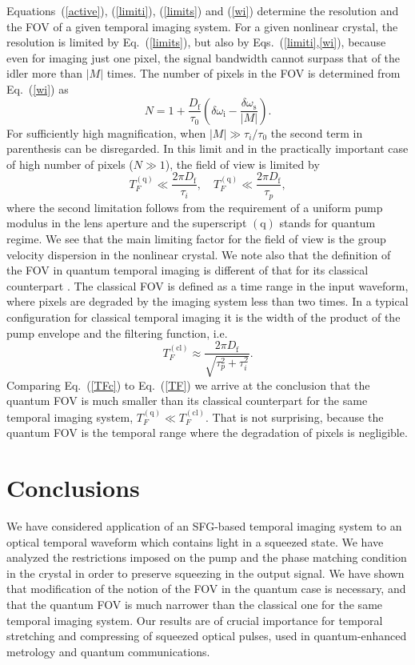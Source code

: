 \documentclass[10pt,twocolumn]{article}
\begin{document}
Equations~(\ref{active}), (\ref{limiti}), (\ref{limits}) and (\ref{wi}) determine the resolution and the FOV of a given temporal imaging system. For a given nonlinear crystal, the resolution is limited by Eq.~(\ref{limits}), but also by Eqs.~(\ref{limiti},\ref{wi}), because even for imaging just one pixel, the signal bandwidth cannot surpass that of the idler more than $|M|$ times. The number of pixels in the FOV is determined from Eq.~(\ref{wi}) as
\begin{equation}\label{N}
N = 1 + \frac{D_{\mathrm{f}}}{\tau_0} \left(\delta\omega_{\mathrm{i}}-\frac{\delta\omega_{\mathrm{s}}}{|M|}\right).
\end{equation}
For sufficiently high magnification, when $|M|\gg \tau_i/\tau_0$ the second term in parenthesis can be disregarded. In this limit and in the practically important case of high number of pixels ($N\gg1$), the field of view is limited by
\begin{equation}\label{TF}
T_F^{(\mathrm{q})} \ll \frac{2\pi D_{\mathrm{f}}}{\tau_i},\quad T_F^{(\mathrm{q})} \ll \frac{2\pi D_{\mathrm{f}}}{\tau_p},
\end{equation}
where the second limitation follows from the requirement of a uniform pump modulus in the lens aperture and the superscript $(\mathrm{q})$ stands for quantum regime. We see that the main limiting factor for the field of view is the group velocity dispersion in the nonlinear crystal. We note also that the definition of the FOV in quantum temporal imaging is different of that for its classical counterpart \cite{Bennett2000b}. The classical FOV is defined as a time range in the input waveform, where pixels are degraded by the imaging system less than two times. In a typical configuration for classical temporal imaging it is the width of the product of the pump envelope and the filtering function, i.e.
\begin{equation}\label{TFc}
T_{F}^{(\mathrm{cl})} \approx \frac{2\pi D_{\mathrm{f}}}{\sqrt{\tau_p^2+\tau_i^2}}.
\end{equation}
Comparing Eq.~(\ref{TFc}) to Eq.~(\ref{TF}) we arrive at the conclusion that the quantum FOV is much smaller than its classical counterpart for the same temporal imaging system, $T_{F}^{(\mathrm{q})}\ll T_{F}^{(\mathrm{cl})}$. That is not surprising, because the quantum FOV is the temporal range where the degradation of pixels is negligible.

\section{Conclusions}
We have considered application of an SFG-based temporal imaging system to an optical temporal waveform which contains light in a squeezed state. We have analyzed the restrictions imposed on the pump and the phase matching condition in the crystal in order to preserve squeezing in the output signal. We have shown that modification of the notion of the FOV in the quantum case is necessary, and that the quantum FOV is much narrower than the classical one for the same temporal imaging system. Our results are of crucial importance for temporal stretching and compressing of squeezed optical pulses, used in quantum-enhanced metrology and quantum communications.
\end{document}

